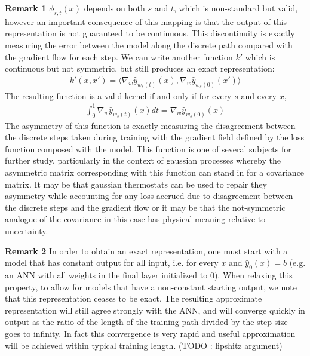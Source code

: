 \textbf{Remark 1} \label{rem:asym}$\phi_{s,t}(x)$ depends on both $s$ and $t$, which is non-standard but valid, however an important consequence of this mapping is that the output of this representation is not guaranteed to be continuous. This discontinuity is exactly measuring the error between the model along the discrete path compared with the gradient flow for each step. We can write another function $k'$ which is continuous but not symmetric, but still produces an exact representation:
\begin{align}
k'(x, x') = \langle \nabla_w \hat y_{w_s(t)}(x), \nabla_w \hat y_{w_s(0)}(x')\rangle
\end{align}
The resulting function is a valid kernel if and only if for every $s$ and every $x$, 
\begin{align}
\label{eq:cond}
    \int_0^1 \nabla_w \hat y_{w_s(t)}(x)dt = \nabla_w \hat y_{w_s(0)}(x)
\end{align}
The asymmetry of this function is exactly measuring the disagreement between the discrete steps taken during training with the gradient field defined by the loss function composed with the model. This function is one of several subjects for further study, particularly in the context of gaussian processes whereby the asymmetric matrix corresponding with this function can stand in for a covariance matrix. It may be that gaussian thermostats can be used to repair they asymmetry while accounting for any loss accrued due to disagreement between the discrete steps and the gradient flow or it may be that the not-symmetric analogue of the covariance in this case has physical meaning relative to uncertainty. 

\textbf{Remark 2} In order to obtain an exact representation, one must start with a model that has constant output for all input, i.e. for every $x$ and $\hat y_0(x) = b$ (e.g. an ANN with all weights in the final layer initialized to 0). When relaxing this property, to allow for models that have a non-constant starting output, we note that this representation ceases to be exact. The resulting approximate representation will still agree strongly with the ANN, and will converge quickly in output as the ratio of the length of the training path divided by the step size goes to infinity. In fact this convergence is very rapid and useful approximation will be achieved within typical training length. (TODO : lipshitz argument)

